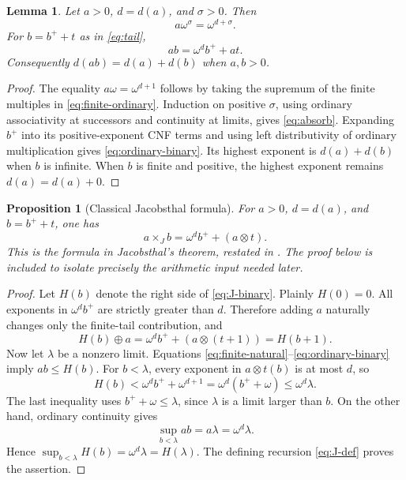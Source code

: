 \documentclass[11pt,letterpaper]{article}
\newtheorem{lemma}[theorem]{Lemma}
\newtheorem{proposition}[theorem]{Proposition}
\theoremstyle{definition}
\theoremstyle{remark}
\newcommand{\J}{\mathbin{\times_{\!J}}}
\begin{document}
\begin{lemma}\label{lem:ordinary}
Let $a>0$, $d=d(a)$, and $\sigma>0$. Then
\begin{equation}\label{eq:absorb}
 a\omega^\sigma=\omega^{d+\sigma}.
\end{equation}
For $b=b^++t$ as in \eqref{eq:tail},
\begin{equation}\label{eq:ordinary-binary}
 ab=\omega^d b^++at.
\end{equation}
Consequently $d(ab)=d(a)+d(b)$ when $a,b>0$.
\end{lemma}

\begin{proof}
The equality $a\omega=\omega^{d+1}$ follows by taking the supremum of the
finite multiples in \eqref{eq:finite-ordinary}. Induction on positive
$\sigma$, using ordinary associativity at successors and continuity at
limits, gives \eqref{eq:absorb}. Expanding $b^+$ into its positive-exponent
CNF terms and using left distributivity of ordinary multiplication gives
\eqref{eq:ordinary-binary}. Its highest exponent is $d(a)+d(b)$ when
$b$ is infinite. When $b$ is finite and positive, the highest exponent
remains $d(a)=d(a)+0$.
\end{proof}

\begin{proposition}[Classical Jacobsthal formula]\label{prop:binary}
For $a>0$, $d=d(a)$, and $b=b^++t$, one has
\begin{equation}\label{eq:J-binary}
 \boxed{a\J b=\omega^d b^++(a\otimes t).}
\end{equation}
This is the formula in Jacobsthal's theorem, restated in
\cite[Theorem~2.10]{altman}. The proof below is included to isolate precisely
the arithmetic input needed later.
\end{proposition}

\begin{proof}
Let $H(b)$ denote the right side of \eqref{eq:J-binary}. Plainly $H(0)=0$.
All exponents in $\omega^d b^+$ are strictly greater than $d$. Therefore
adding $a$ naturally changes only the finite-tail contribution, and
\[
 H(b)\oplus a=\omega^d b^++(a\otimes(t+1))=H(b+1).
\]
Now let $\lambda$ be a nonzero limit. Equations
\eqref{eq:finite-natural}--\eqref{eq:ordinary-binary} imply $ab\leq H(b)$.
For $b<\lambda$, every exponent in $a\otimes t(b)$ is at most $d$, so
\[
 H(b)<\omega^d b^++\omega^{d+1}
      =\omega^d(b^++\omega)\leq\omega^d\lambda.
\]
The last inequality uses $b^++\omega\leq\lambda$, since $\lambda$ is a
limit larger than $b$. On the other hand, ordinary continuity gives
\[
 \sup_{b<\lambda}ab=a\lambda=\omega^d\lambda.
\]
Hence $\sup_{b<\lambda}H(b)=\omega^d\lambda=H(\lambda)$. The defining
recursion \eqref{eq:J-def} proves the assertion.
\end{proof}
\end{document}
